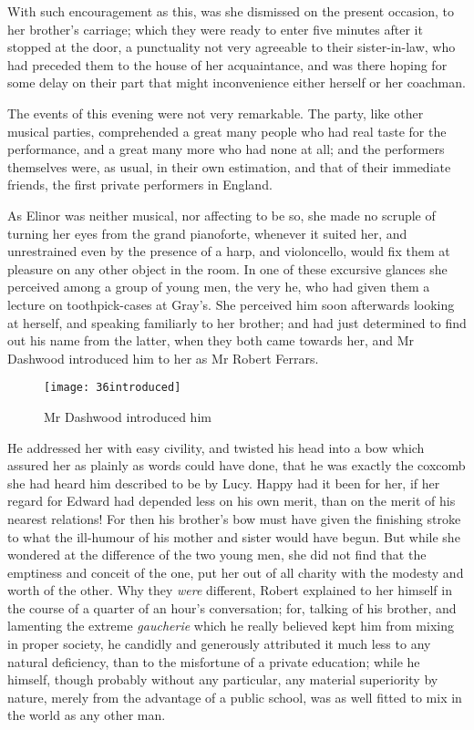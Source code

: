 With such encouragement as this, was she dismissed on the present occasion, to her brother’s carriage; which they were ready to enter five minutes after it stopped at the door, a punctuality not very agreeable to their sister-in-law, who had preceded them to the house of her acquaintance, and was there hoping for some delay on their part that might inconvenience either herself or her coachman.

The events of this evening were not very remarkable. The party, like other musical parties, comprehended a great many people who had real taste for the performance, and a great many more who had none at all; and the performers themselves were, as usual, in their own estimation, and that of their immediate friends, the first private performers in England.

As Elinor was neither musical, nor affecting to be so, she made no scruple of turning her eyes from the grand pianoforte, whenever it suited her, and unrestrained even by the presence of a harp, and violoncello, would fix them at pleasure on any other object in the room. In one of these excursive glances she perceived among a group of young men, the very he, who had given them a lecture on toothpick-cases at Gray’s. She perceived him soon afterwards looking at herself, and speaking familiarly to her brother; and had just determined to find out his name from the latter, when they both came towards her, and Mr Dashwood introduced him to her as Mr Robert Ferrars.

\begin{figure}[tbph]
\centering
\texttt{[image: 36introduced]}
\caption{Mr Dashwood introduced him}
\end{figure}

He addressed her with easy civility, and twisted his head into a bow which assured her as plainly as words could have done, that he was exactly the coxcomb she had heard him described to be by Lucy. Happy had it been for her, if her regard for Edward had depended less on his own merit, than on the merit of his nearest relations! For then his brother’s bow must have given the finishing stroke to what the ill-humour of his mother and sister would have begun. But while she wondered at the difference of the two young men, she did not find that the emptiness and conceit of the one, put her out of all charity with the modesty and worth of the other. Why they \textit{were} different, Robert explained to her himself in the course of a quarter of an hour’s conversation; for, talking of his brother, and lamenting the extreme \textit{gaucherie} which he really believed kept him from mixing in proper society, he candidly and generously attributed it much less to any natural deficiency, than to the misfortune of a private education; while he himself, though probably without any particular, any material superiority by nature, merely from the advantage of a public school, was as well fitted to mix in the world as any other man.

